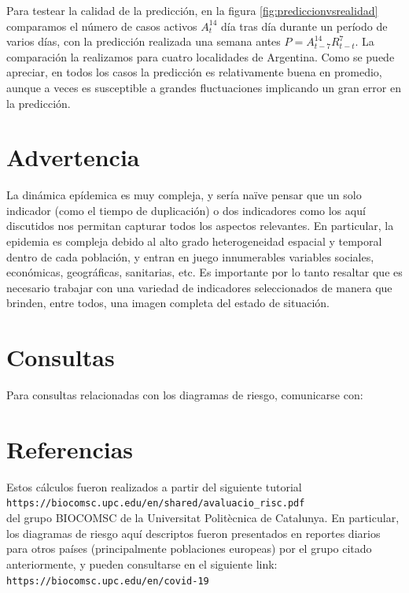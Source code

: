 \documentclass[12pt,a4paper]{article}
\begin{document}
Para testear la calidad de la predicción, 
en la figura \ref{fig:prediccionvsrealidad} 
comparamos el número de casos activos $A^{14}_t$ día tras día durante 
un período de varios días, con la predicción realizada 
una semana antes $P=A^{14}_{t-7} R^7_{t-t}$. 
La comparación la realizamos 
para cuatro localidades de Argentina.
Como se puede apreciar, en todos los casos 
la predicción es relativamente buena en promedio, 
aunque a veces es susceptible a grandes 
fluctuaciones implicando un gran error en la 
predicción.


\section*{Advertencia}
La dinámica epídemica es muy compleja, y sería na\"{i}ve pensar que un solo indicador 
(como el tiempo de duplicación) o dos indicadores como los aquí discutidos nos permitan capturar todos los aspectos relevantes. En particular, la epidemia es compleja debido al alto grado heterogeneidad espacial y temporal dentro de cada población, y entran en juego 
innumerables variables sociales, económicas, geográficas, sanitarias, etc.
Es importante por lo tanto resaltar que es necesario trabajar con una variedad de indicadores seleccionados de manera que brinden, entre todos, una imagen completa del estado de situación. 


\section*{Consultas}
Para consultas relacionadas con los diagramas de riesgo, comunicarse con:\\

\noindent{}

\section*{Referencias}
Estos cálculos fueron realizados a partir del siguiente 
tutorial\\

\verb|https://biocomsc.upc.edu/en/shared/avaluacio_risc.pdf|\\

del grupo BIOCOMSC de la Universitat Politècnica de Catalunya. 
En particular, los diagramas de riesgo aquí descriptos fueron presentados
en reportes diarios para otros países (principalmente poblaciones europeas) 
por el grupo citado anteriormente, y pueden consultarse en el siguiente link:\\

\verb|https://biocomsc.upc.edu/en/covid-19|
\end{document}
